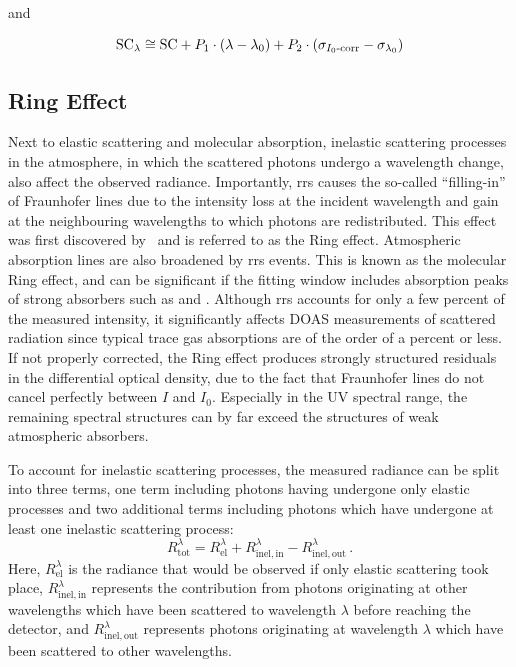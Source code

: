 and

\begin{equation}
\mathrm{SC}_\lambda\cong\mathrm{SC}+P_1\cdot\left( \lambda-\lambda_0\right) +P_2\cdot\left( \sigma_{I_0\mathrm{\textnormal{-}corr}}-\sigma_{\lambda_0}\right)
\end{equation}

\subsection{Ring Effect}\label{sec:ring-effect}
Next to elastic scattering and molecular absorption, inelastic
scattering processes in the atmosphere, in which the scattered photons
undergo a wavelength change, also affect the observed radiance.
Importantly, \acrfull{rrs} causes the so-called “filling-in” of
Fraunhofer lines due to the intensity loss at the incident wavelength
and gain at the neighbouring wavelengths to which photons are
redistributed.  This effect was first discovered
by~\citet{grainger_1962} and is referred to as the Ring effect.
Atmospheric absorption lines are also broadened by \gls{rrs} events.
This is known as the molecular Ring effect, and can be significant if
the fitting window includes absorption peaks of strong absorbers such
as \ozone{} and .  Although \gls{rrs} accounts for only a few
percent of the measured intensity, it significantly affects DOAS
measurements of scattered radiation since typical trace gas
absorptions are of the order of a percent or less.  If not properly
corrected, the Ring effect produces strongly structured residuals in
the differential optical density, due to the fact that Fraunhofer
lines do not cancel perfectly between $I$ and $I_0$. Especially in the
UV spectral range, the remaining spectral structures can by far exceed
the structures of weak atmospheric absorbers.

To account for inelastic scattering processes, the measured radiance
can be split into three terms, one term including photons having
undergone only elastic processes and two additional terms including
photons which have undergone at least one inelastic scattering
process:
\begin{equation}\label{eq:elastic_inelastic}
R_\mathrm{tot}^\lambda=R_\mathrm{el}^\lambda+R_\mathrm{inel, in}^\lambda-R_\mathrm{inel, out}^\lambda \, .
\end{equation}
Here, $R_\mathrm{el}^\lambda$ is the radiance that would be observed if only elastic scattering took place, $R^\lambda_\mathrm{inel, in}$ represents the contribution from photons originating at other wavelengths which have been scattered to wavelength $\lambda$ before reaching the detector, and $R_\mathrm{inel, out}^\lambda$ represents photons originating at wavelength $\lambda$ which have been scattered to other wavelengths.

